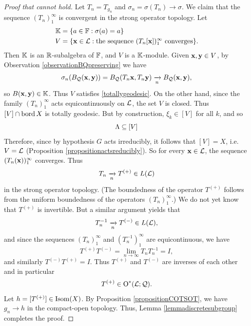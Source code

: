 \begin{proof}[Proof that  cannot hold]
Let $T_n = T_{g_n}$ and $\sigma_n = \sigma(T_n) \to \sigma$. We claim that the sequence $(T_n)_1^\infty$ is convergent in the strong operator topology. Let
\begin{align*}
\K &= \{a\in\F : \sigma(a) = a\}\\
V &= \{\xx\in\LL:\text{the sequence $(T_n[\xx])_1^\infty$ converges}\}.
\end{align*}
Then $\K$ is an $\R$-subalgebra of $\F$, and $V$ is a $\K$-module. Given $\mathbf x,\mathbf y\in V$, by Observation \ref{observationBQpreserving} we have
\[
\sigma_n(B_\mathcal Q(\mathbf x,\mathbf y)) = B_\mathcal Q(T_n\mathbf x,T_n\mathbf y) \xrightarrow[n]{} B_\mathcal Q(\mathbf x,\mathbf y),
\]
so $B(\xx,\yy)\in \K$. Thus $V$ satisfies \eqref{totallygeodesic}. On the other hand, since the family $(T_n)_1^\infty$ acts equicontinuously on $\mathcal L$, the set $V$ is closed. Thus $[V]\cap\operatorname{bord} X$ is totally geodesic. But by construction, $\xi_k\in[V]$ for all $k$, and so
\[
\Lambda \subseteq [V]
\]
Therefore, since by hypothesis $G$ acts irreducibly, it follows that $[V] = X$, i.e. $V = \mathcal L$ (Proposition \ref{propositionactsreducibly}). So for every $\mathbf x\in\mathcal L$, the sequence $(T_n(\mathbf x))_1^\infty$ converges. Thus
\[
T_n \xrightarrow[n]{} T^{(+)}\in L(\mathcal L)
\]
in the strong operator topology. (The boundedness of the operator $T^{(+)}$ follows from the uniform boundedness of the operators $(T_n)_1^\infty$.) We do not yet know that $T^{(+)}$ is invertible. But a similar argument yields that
\[
T_n^{-1} \xrightarrow[n]{} T^{(-)}\in L(\mathcal L),
\]
and since the sequences $(T_n)_1^\infty$ and $(T_n^{-1})_1^\infty$ are equicontinuous, we have
\[
T^{(+)}T^{(-)} = \lim_{n\to\infty}T_n T_n^{-1} = I,
\]
and similarly $T^{(-)}T^{(+)} = I$. Thus $T^{(+)}$ and $T^{(-)}$ are inverses of each other and in particular
\[
T^{(+)}\in \operatorname{O}^*(\mathcal L;\mathcal Q).
\]
Let $h = [T^{(+)}]\in\operatorname{Isom}(X)$. By Proposition \ref{propositionCOTSOT}, we have $g_n\to h$ in the compact-open topology. Thus, Lemma \ref{lemmadiscretesubgroup} completes the proof.
\end{proof}

\endinput